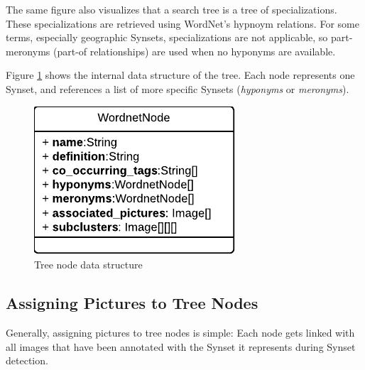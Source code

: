 The same figure also visualizes that a search tree is a tree of specializations. These specializations are retrieved using WordNet's hypnoym relations. For some terms, especially geographic Synsets, specializations are not applicable, so part-meronyms (part-of relationships) are used when no hyponyms are available.

\bigskip
Figure \ref{fig_nodestructure} shows the internal data structure of the tree. Each node represents one Synset, and references a list of more specific Synsets (\emph{hyponyms} or \emph{meronyms}).

\begin{figure}[h]
\centering
\includegraphics[]{images/wordnetnode_class_diagram.pdf}
\caption{Tree node data structure}
\label{fig_nodestructure}
\end{figure}


\subsection{Assigning Pictures to Tree Nodes}
\label{sec_picturestonodes}
Generally, assigning pictures to tree nodes is simple: Each node gets linked with all images that have been annotated with the Synset it represents during Synset detection.

